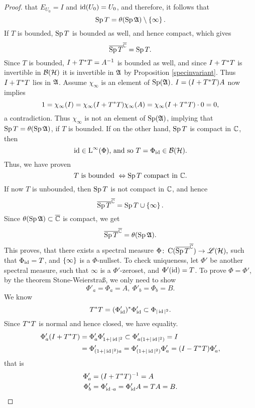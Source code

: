 \begin{proof}
that $E_{U_0} = I$ and $\operatorname{id}(U_0) = U_0$, and therefore, it follows that
\[
 \operatorname{Sp} T = \theta ( \operatorname{Sp} \mathfrak{A} ) \setminus \left\lbrace \infty \right\rbrace.
\]
If $T$ is bounded, $\operatorname{Sp} T$ is bounded as well, and hence compact, which gives
\[
\overline{\operatorname{Sp} T }^{{\overline{\mathbb{C}}}} = \operatorname{Sp} T.
\]
Since $T$ is bounded, $I + T^{*} T = A^{-1}$ is bounded as well, and since 
$I +T ^{*} T$ is invertible in $\mathcal{B}(\mathcal{H})$ it is invertible in $\mathfrak{A}$ by Proposition
\ref{specinvariant}. Thus $I + T ^{*} T $ lies in $\mathfrak{A}$. Assume $\chi_\infty$ is an
element of $\operatorname{Sp}(\mathfrak{A})$. $I = (I +T ^{*} T )A$
now implies
\[
 1 = \chi_\infty (I) = \chi_\infty ( I+ T ^{*} T) \chi_\infty ( A) = 
 \chi_\infty ( I + T ^{*} T) \cdot 0 = 0 ,
\]
a contradiction. Thus  $\chi_\infty$ is not an element of $\operatorname{Sp}(\mathfrak{A})$, implying
that $ \operatorname{Sp} T  = \theta ( \operatorname{Sp} \mathfrak{A} )$, if $T$  is bounded.
If on the other hand, $\operatorname{Sp} T$ is compact in $\mathbb{C}$, then 
\[
 \operatorname{id} \in {\text{L}^\infty }(\Phi) \text{, and so } T= \Phi_{\operatorname{id}} \in \mathcal{B}(\mathcal{H}).
\]
Thus, we have proven 
\[
 T \text{ is bounded } \Leftrightarrow \operatorname{Sp} T \text{ compact in } \mathbb{C}.
\]
If now $T$ is unbounded, then $\operatorname{Sp} T$ is not compact in $\mathbb{C}$, and hence
\[
\overline{\operatorname{Sp} T}^{{\overline{\mathbb{C}}}} = \operatorname{Sp} T \cup \left\lbrace \infty \right\rbrace.
\]
Since $\theta(\operatorname{Sp} \mathfrak{A}) \subset {\overline{\mathbb{C}}}$ is compact, we get
\[
 \overline{\operatorname{Sp} T}^{{\overline{\mathbb{C}}}} = \theta ( \operatorname{Sp} \mathfrak{A}).
\]
This proves, that there exists a spectral measure 
$\Phi \colon \operatorname{C}(\overline{\operatorname{Sp} T}^{{\overline{\mathbb{C}}}}) \to \mathscr{L}(\mathcal{H}),$ such that $\Phi_{\operatorname{id}} = T$,
and $\left\lbrace \infty \right\rbrace$ is a $\Phi$-nullset.
 To check uniqueness, let $\Phi'$ be another spectral measure, such that
$\infty$ is a $\Phi'$-zeroset, and $\Phi'( \operatorname{id}) = T$. To prove $\Phi = \Phi'$,
by the theorem Stone-Weierstraß, we only need to show
\[
 \Phi'_a = \Phi_a = A,~ \Phi'_b = \Phi_b=B.
\]
We know
\[
 T^{*} T = (\Phi'_{\operatorname{id}}) ^{*} \Phi'_{\operatorname{id}} \subset \Phi_{|\operatorname{id}|^2}.
\]
Since $T^{*} T$ is normal and hence closed, we have equality.
\begin{align*}
 \Phi'_a ( I + T ^{*} T ) &= \Phi'_a \Phi'_{1 +| \operatorname{id} | ^2} \subset 
 \Phi'_{a (1 + |\operatorname{id}|^2)} = I \\&= \Phi'_{ (1 + |\operatorname{id}|^2)a} 
 = \Phi'_{(1 + |\operatorname{id}|^2)}\Phi'_{a}  = (I - T ^{*} T) \Phi'_a,
 \end{align*}
 that is 
 \begin{align*}
 \Phi'_a &= (I + T ^{*} T)^{-1} = A \\
 \Phi'_b &= \Phi'_{\operatorname{id} \cdot a} = \Phi'_{\operatorname{id}} A = TA = B.
\end{align*}
\end{proof}


















